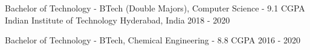 

\begin{cventries}
\vspace{-1mm}

  \cventry
    {Bachelor of Technology - BTech (Double Majors), Computer Science - 9.1 CGPA} %
    {Indian Institute of Technology} %
    {Hyderabad, India} %
    {2018 - 2020} %
    {
    }

  \vspace{-6mm}
    
  \cventry
    {Bachelor of Technology - BTech, Chemical Engineering - 8.8 CGPA} %
    { } %
    { } %
    {2016 - 2020} %
    {
    }
\end{cventries}

\vspace{-6mm}